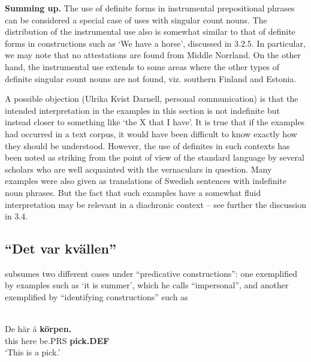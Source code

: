 \z

\textbf{Summing up.} The use of definite forms in instrumental prepositional phrases can be considered a special case of uses with singular count nouns. The distribution of the instrumental use also is somewhat similar to that of definite forms in constructions such as ‘We have a horse’, discussed in 3.2.5. In particular, we may note that no attestations are found from Middle Norrland. On the other hand, the instrumental use extends to some areas where the other types of definite singular count nouns are not found, viz. southern Finland and Estonia. 


A possible objection (Ulrika Kvist Darnell, personal communication) is that the intended interpretation in the examples in this section is not indefinite but instead closer to something like ‘the X that I have’. It is true that if the examples had occurred in a text corpus, it would have been difficult to know exactly how they should be understood. However, the use of definites in such contexts has been noted as striking from the point of view of the standard language by several scholars who are well acquainted with the vernaculars in question. Many examples were also given as translations of Swedish sentences with indefinite noun phrases. But the fact that such examples have a somewhat fluid interpretation may be relevant in a diachronic context – see further the discussion in 3.4. 


\subsection{  “Det var kvällen”}
\label{bkm:Ref224379336}
\citet[16]{Delsing2003a} subsumes two different cases under “predicative constructions”: one exemplified by examples such as  ‘it is summer’, which he calls “impersonal”, and another exemplified by “identifying constructions” such as 


\ea \label{} 
\\
\gll De  här  ä  \textbf{körpen.}\\
this  here  be.PRS  \textbf{pick.DEF}\\
\glt ‘This is a pick.’

